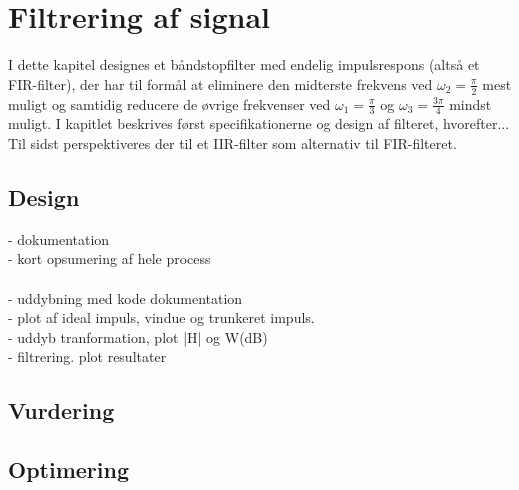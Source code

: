\chapter{Filtrering af signal}
I dette kapitel designes et båndstopfilter med endelig impulsrespons (altså et FIR-filter), der har til formål at eliminere den midterste frekvens ved $\omega_2 = \frac{\pi}{2}$ mest muligt og samtidig reducere de øvrige frekvenser ved $\omega_1 = \frac{\pi}{3}$ og $\omega_3 = \frac{3\pi}{4}$ mindst muligt. I kapitlet beskrives først specifikationerne og design af filteret, hvorefter... Til sidst perspektiveres der til et IIR-filter som alternativ til FIR-filteret.


\section{Design}
- dokumentation\\
- kort opsumering af hele process\\ 
\\
- uddybning med kode dokumentation\\
- plot af ideal impuls, vindue og trunkeret impuls.\\ 
- uddyb tranformation, plot |H| og W(dB)\\
- filtrering. plot resultater \\
\section{Vurdering}




\section{Optimering}

